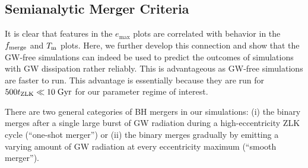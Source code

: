 \documentclass[
        fleqn,
        usenatbib,
    ]{mnras}
\begin{document}
\subsection{Semianalytic Merger Criteria}\label{ss:nogw_merger}

It is clear that features in the $e_{\max}$ plots are correlated with behavior
in the $f_{\rm merge}$ and $T_{\rm m}$ plots. Here, we further develop this
connection and show that the GW-free simulations can indeed be used to predict
the outcomes of simulations with GW dissipation rather reliably. This is
advantageous as GW-free simulations are faster to run. This advantage is
essentially because they are run for $500 t_{\rm ZLK} \ll 10\;\mathrm{Gyr}$ for
our parameter regime of interest.

There are two general categories of BH mergers in our simulations: (i)
the binary merges after a single large burst of GW radiation during a
high-eccentricity ZLK cycle (``one-shot merger'') or (ii) the binary merges
gradually by emitting a varying amount of GW radiation at every eccentricity
maximum (``smooth merger'').
\end{document}
